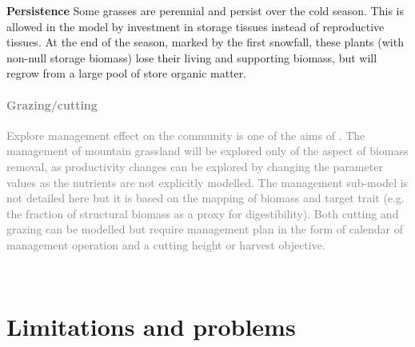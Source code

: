 \textbf{Persistence} Some grasses are perennial and persist over the cold season. This is allowed in the model by investment in storage tissues instead of reproductive tissues.  At the end of the season, marked by the first snowfall, these plants (with non-null storage biomass) lose their living and supporting biomass, but will regrow from a large pool of store organic matter.

\textcolor{gray}{\paragraph{Grazing/cutting} Explore management effect on the community is one of the aims of \model. The management of mountain grassland will be explored only of the aspect of biomass removal, as productivity changes can be explored by changing the parameter values as the nutrients are not explicitly modelled. The management sub-model is not detailed here but it is based on the mapping of biomass and target trait (e.g. the fraction of structural biomass as a proxy for digestibility). Both cutting and grazing can be modelled but require management plan in the form of calendar of management operation and a cutting height or harvest objective.}\\

\section{Limitations and problems}

